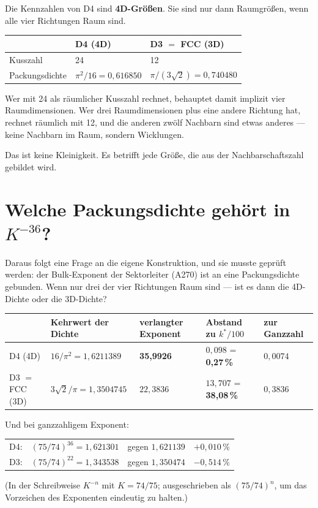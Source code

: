 \documentclass[11pt]{report}
\begin{document}
Die Kennzahlen von D4 sind \textbf{4D-Größen}. Sie sind nur dann
Raumgrößen, wenn alle vier Richtungen Raum sind.

\begin{center}
\begin{tabular}{lll}
\toprule
 & D4 (4D) & D3 $=$ FCC (3D) \\
\midrule
Kusszahl & 24 & 12 \\
Packungsdichte & $\pi^2/16 = 0{,}616850$ & $\pi/(3\sqrt2) = 0{,}740480$ \\
\bottomrule
\end{tabular}
\end{center}

Wer mit 24 als räumlicher Kusszahl rechnet, behauptet damit implizit
vier Raumdimensionen. Wer drei Raumdimensionen plus eine andere
Richtung hat, rechnet räumlich mit 12, und die anderen zwölf Nachbarn
sind etwas anderes --- keine Nachbarn im Raum, sondern Wicklungen.

Das ist keine Kleinigkeit. Es betrifft jede Größe, die aus der
Nachbarschaftszahl gebildet wird.

\section{Welche Packungsdichte gehört in \texorpdfstring{$K^{-36}$}{K hoch -36}?}

Daraus folgt eine Frage an die eigene Konstruktion, und sie musste
geprüft werden: der Bulk-Exponent der Sektorleiter (A270) ist an eine
Packungsdichte gebunden. Wenn nur drei der vier Richtungen Raum sind
--- ist es dann die 4D-Dichte oder die 3D-Dichte?

\begin{center}
\small
\begin{tabular}{lllll}
\toprule
 & Kehrwert der Dichte & verlangter Exponent
 & Abstand zu $k^*/100$ & zur Ganzzahl \\
\midrule
D4 (4D) & $16/\pi^2 = 1{,}6211389$ & \textbf{35{,}9926}
  & $0{,}098$ = \textbf{0{,}27\,\%} & $0{,}0074$ \\
D3 $=$ FCC (3D) & $3\sqrt2/\pi = 1{,}3504745$ & $22{,}3836$
  & $13{,}707$ = \textbf{38{,}08\,\%} & $0{,}3836$ \\
\bottomrule
\end{tabular}
\end{center}

Und bei ganzzahligem Exponent:
\begin{center}
\begin{tabular}{lllr}
D4: & $(75/74)^{36} = 1{,}621301$ & gegen $1{,}621139$ & $+0{,}010\,\%$ \\
D3: & $(75/74)^{22} = 1{,}343538$ & gegen $1{,}350474$ & $-0{,}514\,\%$ \\
\end{tabular}
\end{center}
(In der Schreibweise $K^{-n}$ mit $K = 74/75$; ausgeschrieben als
$(75/74)^n$, um das Vorzeichen des Exponenten eindeutig zu halten.)
\end{document}
